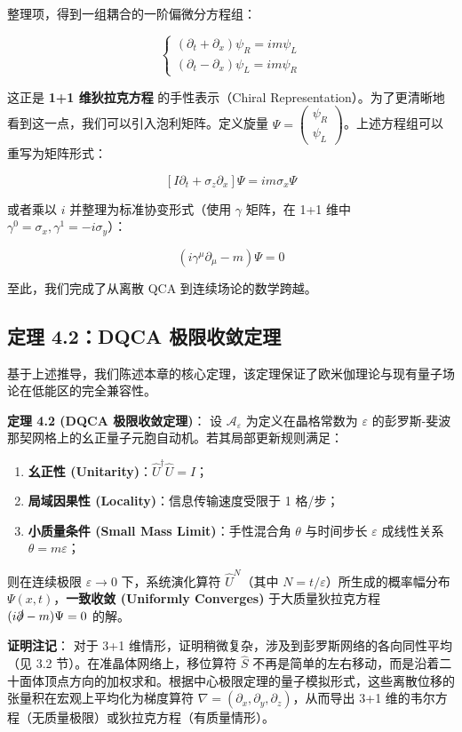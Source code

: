 整理项，得到一组耦合的一阶偏微分方程组：

\[\begin{cases}
(\partial_t + \partial_x) \psi_R = i m \psi_L \\
(\partial_t - \partial_x) \psi_L = i m \psi_R
\end{cases}\]

这正是 \textbf{1+1 维狄拉克方程} 的手性表示（Chiral Representation）。为了更清晰地看到这一点，我们可以引入泡利矩阵。定义旋量 $\Psi = \begin{pmatrix} \psi_R \\ \psi_L \end{pmatrix}$。上述方程组可以重写为矩阵形式：

\[\left[ I \partial_t + \sigma_z \partial_x \right] \Psi = i m \sigma_x \Psi\]

或者乘以 $i$ 并整理为标准协变形式（使用 $\gamma$ 矩阵，在 1+1 维中 $\gamma^0 = \sigma_x, \gamma^1 = -i\sigma_y$）：

\[(i \gamma^\mu \partial_\mu - m) \Psi = 0\]

至此，我们完成了从离散 QCA 到连续场论的数学跨越。

\subsection{定理 4.2：DQCA 极限收敛定理}

基于上述推导，我们陈述本章的核心定理，该定理保证了欧米伽理论与现有量子场论在低能区的完全兼容性。

\textbf{定理 4.2 (DQCA 极限收敛定理)}：
设 $\mathcal{A}_\varepsilon$ 为定义在晶格常数为 $\varepsilon$ 的彭罗斯-斐波那契网格上的幺正量子元胞自动机。若其局部更新规则满足：

\begin{enumerate}
\item \textbf{幺正性 (Unitarity)}：$\hat{U}^\dagger \hat{U} = I$；
\item \textbf{局域因果性 (Locality)}：信息传输速度受限于 1 格/步；
\item \textbf{小质量条件 (Small Mass Limit)}：手性混合角 $\theta$ 与时间步长 $\varepsilon$ 成线性关系 $\theta = m \varepsilon$；
\end{enumerate}

则在连续极限 $\varepsilon \to 0$ 下，系统演化算符 $\hat{U}^N$（其中 $N = t/\varepsilon$）所生成的概率幅分布 $\Psi(x,t)$，\textbf{一致收敛 (Uniformly Converges)} 于大质量狄拉克方程 $(i \slashed{\partial} - m)\Psi = 0$ 的解。

\textbf{证明注记}：
对于 3+1 维情形，证明稍微复杂，涉及到彭罗斯网络的各向同性平均（见 3.2 节）。在准晶体网络上，移位算符 $\hat{S}$ 不再是简单的左右移动，而是沿着二十面体顶点方向的加权求和。根据中心极限定理的量子模拟形式，这些离散位移的张量积在宏观上平均化为梯度算符 $\nabla = (\partial_x, \partial_y, \partial_z)$，从而导出 3+1 维的韦尔方程（无质量极限）或狄拉克方程（有质量情形）。

